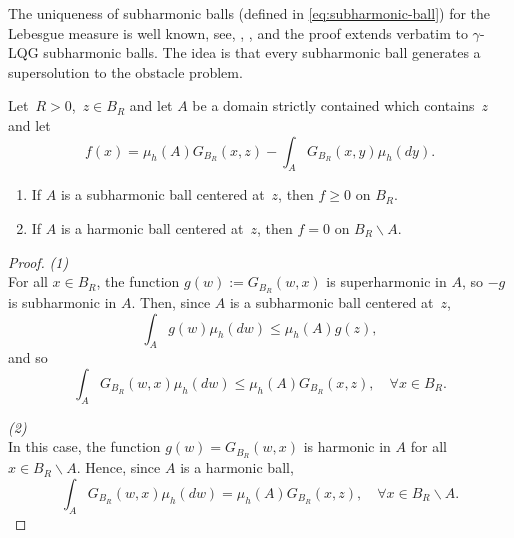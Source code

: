 \documentclass[12pt]{amsart}
\numberwithin{equation}{section}
\begin{document}
	The uniqueness of subharmonic balls (defined in \eqref{eq:subharmonic-ball}) for the Lebesgue measure is well known, see, \eg, \cite{sakai1984solutions},
	and the proof extends verbatim to $\gamma$-LQG subharmonic balls.
	The idea is that every subharmonic ball generates a supersolution to the obstacle problem.
	\begin{lemma} \label{lemma:obstacle-comp}
		Let~$R > 0$,~$z \in B_R$ and let $A$ be a domain strictly contained which contains~$z$ and let
		\begin{equation} \label{eq:obstacle-comp}
		f(x) = \mu_h(A) G_{B_R}(x,z) - \int_{A} G_{B_R}(x,y)  \mu_h(d y).
		\end{equation}
		\begin{enumerate}
			\item If $A$ is a subharmonic ball centered at~$z$, then $f \geq 0$ on $B_R$. 
			\item If $A$ is a harmonic ball centered at~$z$, then $f = 0$ on $B_R \backslash A$. 
		\end{enumerate}
	\end{lemma} 
	\begin{proof}
		{\it (1)} \\
		For all $x \in B_R$, the function $g(w) := G_{B_R}(w, x)$
		is superharmonic in $A$, so $-g$ is subharmonic in $A$. Then, since $A$ is a subharmonic ball centered at~$z$, 
		\begin{equation}
		\int_{A} g(w) \mu_h(dw) \leq \mu_h(A) g(z),
		\end{equation}
		and so 
		\begin{equation}
		\int_{A} G_{B_R}(w, x) \mu_h(dw) \leq \mu_h(A) G_{B_R}(x,z) ,\quad \forall x \in B_R .
		\end{equation} 
		
		{\it (2)} \\ 
		In this case, the function $g(w) = G_{B_R}(w, x)$ is harmonic in $A$ for all $x \in B_R \backslash A$. 
		Hence, since $A$ is a harmonic ball, 
		\begin{equation}
		\int_{A} G_{B_R}(w, x) \mu_h(dw) = \mu_h(A) G_{B_R}(x,z) ,\quad \forall x \in B_R \backslash A .
		\end{equation}
	\end{proof}
	
\end{document}
